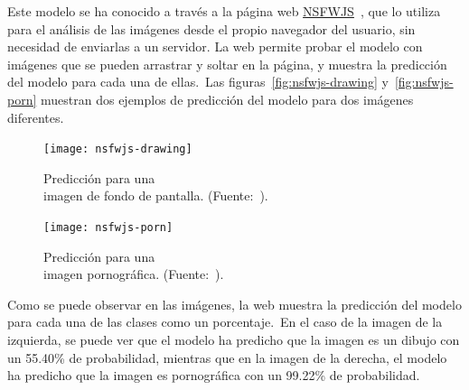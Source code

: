 Este modelo se ha conocido a través a la página web \href{https://nsfwjs.com/}{NSFWJS}~\cite{nsfwjs}, que lo utiliza
para el análisis de las imágenes desde el propio navegador del usuario, sin necesidad de enviarlas a un servidor.
La web permite probar el modelo con imágenes que se pueden arrastrar y soltar en la página, y muestra la
predicción del modelo para cada una de ellas.\ Las figuras~\ref{fig:nsfwjs-drawing} y~\ref{fig:nsfwjs-porn} muestran
dos ejemplos de predicción del modelo para dos imágenes diferentes.

\begin{figure}[H]
	\centering
	\begin{minipage}[c]{0.46\linewidth}
		\centering
		\texttt{[image: nsfwjs-drawing]}
		\caption{Predicción para una\\ imagen de fondo de pantalla. (Fuente:~\cite{nsfwjs}).}
		\label{fig:nsfwjs-drawing}
	\end{minipage}
	\hfill
	\begin{minipage}[c]{0.46\linewidth}
		\centering
		\texttt{[image: nsfwjs-porn]}
		\caption{Predicción para una\\ imagen pornográfica. (Fuente:~\cite{nsfwjs}).}
		\label{fig:nsfwjs-porn}
	\end{minipage}
	\label{fig:nsfwjs-example}
\end{figure}

Como se puede observar en las imágenes, la web muestra la predicción del modelo para cada una de las clases como
un porcentaje.\ En el caso de la imagen de la izquierda, se puede ver que el modelo ha predicho que la imagen es
un dibujo con un 55.40\% de probabilidad, mientras que en la imagen de la derecha, el modelo ha predicho que
la imagen es pornográfica con un 99.22\% de probabilidad.

